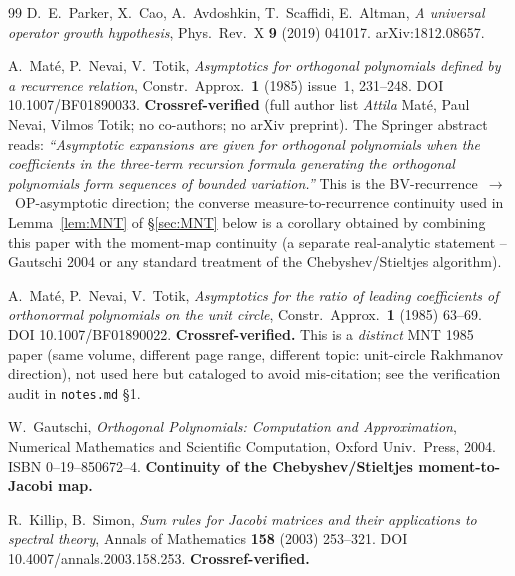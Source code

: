\documentclass[11pt]{article}
\theoremstyle{definition}
\begin{document}
\begin{thebibliography}{99}
 D.\ E.\ Parker, X.\ Cao, A.\ Avdoshkin, T.\ Scaffidi,
E.\ Altman,
\emph{A universal operator growth hypothesis},
Phys.\ Rev.\ X \textbf{9} (2019) 041017. arXiv:1812.08657.

 A.\ Mat\'e, P.\ Nevai, V.\ Totik,
\emph{Asymptotics for orthogonal polynomials defined by a recurrence
relation}, Constr.\ Approx.\ \textbf{1} (1985) issue~1, 231--248.
DOI 10.1007/BF01890033.
\textbf{Crossref-verified} (full author list \emph{Attila} Mat\'e,
Paul Nevai, Vilmos Totik; no co-authors; no arXiv preprint).
The Springer abstract reads: \emph{``Asymptotic expansions are given for
orthogonal polynomials when the coefficients in the three-term
recursion formula generating the orthogonal polynomials form sequences
of bounded variation.''}  This is the BV-recurrence~$\to$~OP-asymptotic
direction; the converse measure-to-recurrence continuity used in
Lemma~\ref{lem:MNT} of \S\ref{sec:MNT} below is a corollary obtained
by combining this paper with the moment-map continuity (a separate
real-analytic statement -- Gautschi 2004 \cite{Gautschi2004} or any
standard treatment of the Chebyshev/Stieltjes algorithm).

 A.\ Mat\'e, P.\ Nevai, V.\ Totik,
\emph{Asymptotics for the ratio of leading coefficients of orthonormal
polynomials on the unit circle}, Constr.\ Approx.\ \textbf{1} (1985)
63--69. DOI 10.1007/BF01890022.
\textbf{Crossref-verified.}  This is a \emph{distinct} MNT 1985 paper
(same volume, different page range, different topic: unit-circle
Rakhmanov direction), not used here but cataloged to avoid
mis-citation; see the verification audit in
\texttt{notes.md} \S 1.

 W.\ Gautschi,
\emph{Orthogonal Polynomials: Computation and Approximation},
Numerical Mathematics and Scientific Computation, Oxford
Univ.\ Press, 2004. ISBN 0--19--850672--4.
\textbf{Continuity of the Chebyshev/Stieltjes moment-to-Jacobi map.}

 R.\ Killip, B.\ Simon,
\emph{Sum rules for Jacobi matrices and their applications to spectral
theory}, Annals of Mathematics \textbf{158} (2003) 253--321.
DOI 10.4007/annals.2003.158.253. \textbf{Crossref-verified.}

\end{thebibliography}
\end{document}
